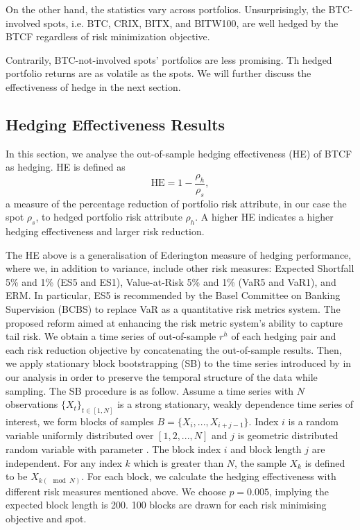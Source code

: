 On the other hand, the statistics vary across portfolios.
Unsurprisingly, the BTC-involved spots, i.e. BTC, CRIX, BITX, and BITW100, are well hedged by the BTCF regardless of risk minimization objective. \medskip

Contrarily, BTC-not-involved spots' portfolios are less promising.
Th hedged portfolio returns are as volatile as the spots.
We will further discuss the effectiveness of hedge in the next section. %








\subsection{Hedging Effectiveness Results}\label{sec: HE results}
In this section, we analyse the out-of-sample hedging effectiveness (HE) of BTCF as hedging.
HE is defined as $$\text{HE} = 1-\frac{\rho_h}{\rho_s},$$
a measure of the percentage reduction of portfolio risk attribute, in our case the spot $\rho_s$,
to hedged portfolio risk attribute $\rho_h$.
A higher HE indicates a higher hedging effectiveness and larger risk reduction. \medskip

The HE above is a generalisation of Ederington measure of hedging performance, where we,
in addition to variance, include other risk measures: Expected Shortfall 5\% and 1\% (ES5 and ES1), Value-at-Risk 5\% and 1\% (VaR5 and VaR1), and ERM.
In particular, ES5 is recommended by the Basel Committee on Banking Supervision (BCBS) to replace VaR as a quantitative risk metrics system.
The proposed reform aimed at enhancing the risk metric system's ability to capture tail risk. \medskip
%
We obtain a time series of out-of-sample $r^h$ of each hedging pair and each risk reduction objective by concatenating the out-of-sample results.
Then, we apply stationary block bootstrapping (SB) to the time series introduced by \cite{Politis1994} in our analysis in order to preserve the temporal structure of the data while sampling.
The SB procedure is as follow.
Assume a time series with $N$ observations $\{X_t\}_{t \in [1,N]}$ is a strong stationary, weakly dependence time series of interest,
we form blocks of samples $B = \{X_i, ..., X_{i+j-1}\}$.
Index $i$ is a random variable uniformly distributed over $[1,2,...,N]$ and $j$ is geometric distributed random variable with parameter .
The block index $i$ and block length $j$ are independent.
For any index $k$ which is greater than $N$, the sample $X_k$ is defined to be $X_{k(\mod N)}$.
For each block, we calculate the hedging effectiveness with different risk measures mentioned above.
We choose $p=0.005$, implying the expected block length is 200.
100 blocks are drawn for each risk minimising objective and spot. \medskip

